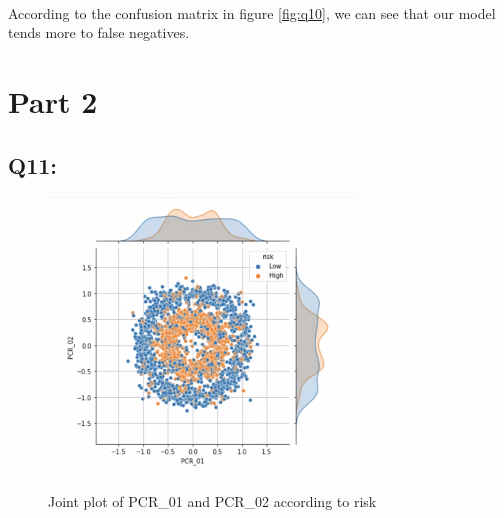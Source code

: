 \documentclass{article}
\begin{document}
    \paragraph*{}
    According to the confusion matrix in figure \ref{fig:q10}, we can see that our model tends more to false negatives.
\section*{Part 2}
\subsection*{Q11:}
    \begin{figure}[H]
        \centering
        \includegraphics{q11_pcr_01_pcr_02_j_plot.png}
        \caption{Joint plot of PCR\_01 and PCR\_02 according to risk}
        \label{fig:pcr_01_pcr_02_j_plot}
    \end{figure}
\end{document}
